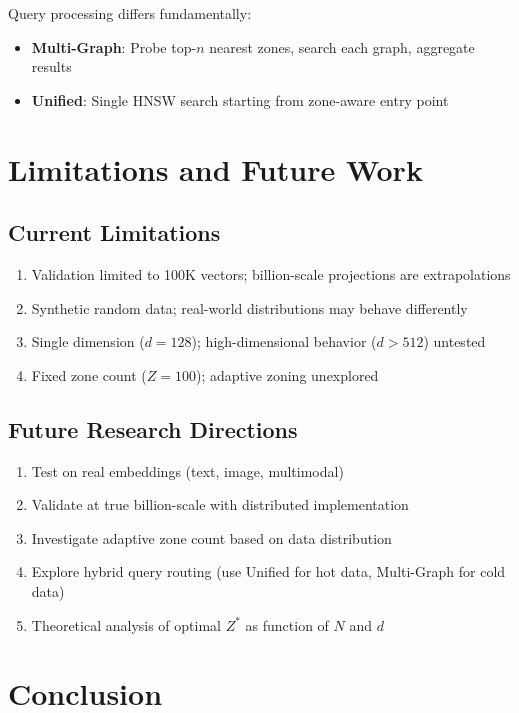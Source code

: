\documentclass[11pt,a4paper]{article}
\begin{document}
Query processing differs fundamentally:
\begin{itemize}
    \item \textbf{Multi-Graph}: Probe top-$n$ nearest zones, search each graph, aggregate results
    \item \textbf{Unified}: Single HNSW search starting from zone-aware entry point
\end{itemize}

\section{Limitations and Future Work}

\subsection{Current Limitations}
\begin{enumerate}
    \item Validation limited to 100K vectors; billion-scale projections are extrapolations
    \item Synthetic random data; real-world distributions may behave differently
    \item Single dimension ($d=128$); high-dimensional behavior ($d>512$) untested
    \item Fixed zone count ($Z=100$); adaptive zoning unexplored
\end{enumerate}

\subsection{Future Research Directions}
\begin{enumerate}
    \item Test on real embeddings (text, image, multimodal)
    \item Validate at true billion-scale with distributed implementation
    \item Investigate adaptive zone count based on data distribution
    \item Explore hybrid query routing (use Unified for hot data, Multi-Graph for cold data)
    \item Theoretical analysis of optimal $Z^*$ as function of $N$ and $d$
\end{enumerate}

\section{Conclusion}
\end{document}
